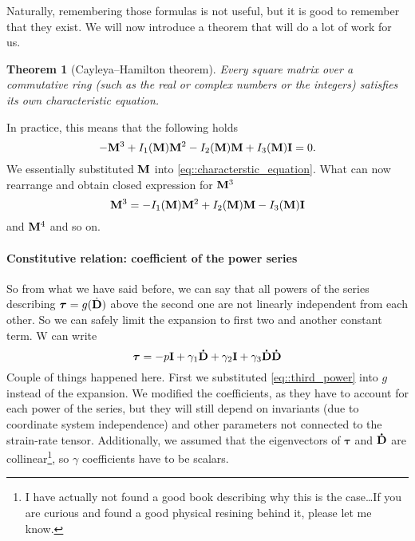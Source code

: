 \documentclass{article}
\newtheorem{theorem}{Theorem}
\begin{document}
Naturally, remembering those formulas is not useful, but it is good to 
remember that they exist. We will now introduce a theorem that will do 
a lot of work for us.
\begin{theorem}[Cayleya–Hamilton theorem]
   Every square matrix over a commutative ring (such as the real or 
   complex numbers or the integers) satisfies its own characteristic equation.
\end{theorem}
\noindent
In practice, this means that the following holds
\begin{equation*}
  -\vb{M}^3 + I_1 \qty(\vb{M})\vb{M}^2 - I_2\qty(\vb{M})\vb{M}
  + I_3\qty(\vb{M})\vb{I} = 0.
\end{equation*}
We essentially substituted \(\vb{M}\) into \autoref{eq::characterstic_equation}.
What can now rearrange and obtain closed expression for \(\vb{M}^3\)
\begin{equation}\label{eq::third_power}
  \vb{M}^3  = - I_1 \qty(\vb{M})\vb{M}^2 + I_2\qty(\vb{M})\vb{M}
  - I_3\qty(\vb{M})\vb{I}
\end{equation}
and \(\vb{M}^4\) and so on.

\paragraph{Constitutive relation: coefficient of the power series}
So from what we have said before, we can say that all powers of the 
series describing \(\bm{\tau} = g(\dot{\vb{D}})\) above the second one
are not linearly independent from each other. So we can safely limit the 
expansion to first two and another constant term. W can write
\[
  \bm{\tau} = -p\vb{I} + \gamma_1 \vb{\dot{D}} + \gamma_2\vb{I} 
  + \gamma_3\vb{\dot{D}}\vb{\dot{D}}
\]
Couple of things happened here. First we substituted \autoref{eq::third_power}
into \(g\) instead of the expansion. We modified the coefficients, as they have
to account for each power of the series, but they will still depend on 
invariants (due to coordinate system independence) and other parameters not 
connected to the strain-rate tensor. Additionally, we assumed that the 
eigenvectors of \(\bm{\tau}\) and \(\vb{\dot{D}}\) are collinear\footnote{%
I have actually not found a good book describing why this is the case\dots If
you are curious and found a good physical resining behind it, please let me 
know.}, so \(\gamma\) coefficients have to be scalars.
\end{document}
